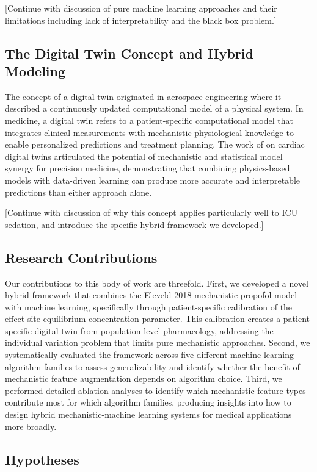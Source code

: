 \documentclass[11pt,a4paper]{article}
\begin{document}
[Continue with discussion of pure machine learning approaches and their limitations including lack of interpretability and the black box problem.]

\subsection{The Digital Twin Concept and Hybrid Modeling}

The concept of a digital twin originated in aerospace engineering where it described a continuously updated computational model of a physical system. In medicine, a digital twin refers to a patient-specific computational model that integrates clinical measurements with mechanistic physiological knowledge to enable personalized predictions and treatment planning. The work of \cite{corral_acero_2020} on cardiac digital twins articulated the potential of mechanistic and statistical model synergy for precision medicine, demonstrating that combining physics-based models with data-driven learning can produce more accurate and interpretable predictions than either approach alone.

[Continue with discussion of why this concept applies particularly well to ICU sedation, and introduce the specific hybrid framework we developed.]

\subsection{Research Contributions}

Our contributions to this body of work are threefold. First, we developed a novel hybrid framework that combines the Eleveld 2018 mechanistic propofol model with machine learning, specifically through patient-specific calibration of the effect-site equilibrium concentration parameter. This calibration creates a patient-specific digital twin from population-level pharmacology, addressing the individual variation problem that limits pure mechanistic approaches. Second, we systematically evaluated the framework across five different machine learning algorithm families to assess generalizability and identify whether the benefit of mechanistic feature augmentation depends on algorithm choice. Third, we performed detailed ablation analyses to identify which mechanistic feature types contribute most for which algorithm families, producing insights into how to design hybrid mechanistic-machine learning systems for medical applications more broadly.

\subsection{Hypotheses}
\end{document}
